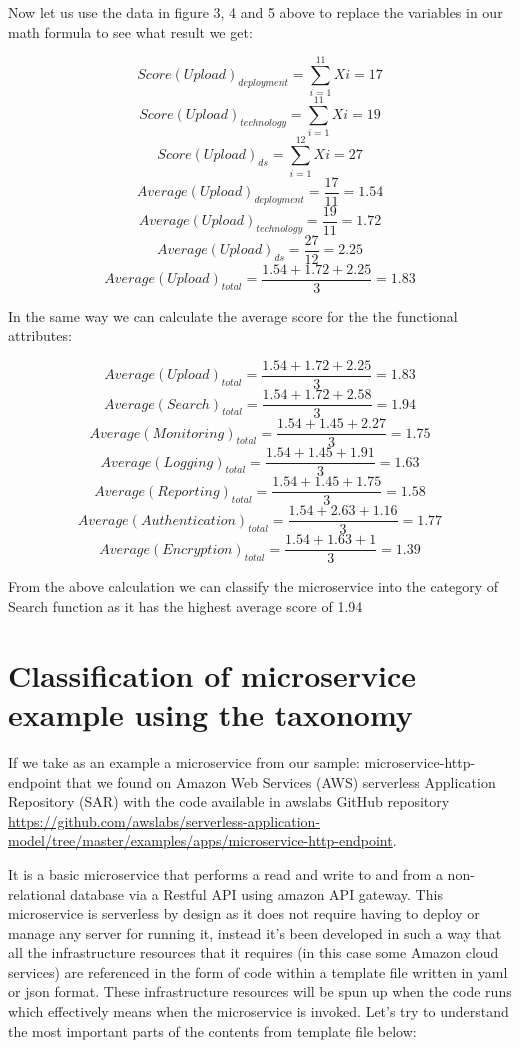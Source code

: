 \documentclass{article}
\begin{document}
Now let us use the data in figure 3, 4 and 5 above to replace the variables in our math formula to see what result we get:

\[Score(Upload)_{deployment}=\sum_{i=1}^{11}Xi = 17\] 
\[Score(Upload)_{technology}=\sum_{i=1}^{11}Xi = 19\] 
\[Score(Upload)_{ds}=\sum_{i=1}^{12}Xi = 27\] 
\[Average(Upload)_{deployment}=\frac{17}{11} = 1.54 \]
\[Average(Upload)_{technology}=\frac{19}{11} = 1.72 \]
\[Average(Upload)_{ds}=\frac{27}{12} = 2.25 \]
\[Average(Upload)_{total}=\frac{1.54 + 1.72 + 2.25}{3} = 1.83\]

In the same way we can calculate the average score for the the functional attributes:

\[Average(Upload)_{total}=\frac{1.54 + 1.72 + 2.25}{3} = 1.83\]
\[Average(Search)_{total}=\frac{1.54 + 1.72 + 2.58}{3} = 1.94\]
\[Average(Monitoring)_{total}=\frac{1.54 + 1.45 + 2.27}{3} = 1.75\]
\[Average(Logging)_{total}=\frac{1.54 + 1.45 + 1.91}{3} = 1.63\]
\[Average(Reporting)_{total}=\frac{1.54 + 1.45 + 1.75}{3} = 1.58\]
\[Average(Authentication)_{total}=\frac{1.54 + 2.63 + 1.16}{3} = 1.77\]
\[Average(Encryption)_{total}=\frac{1.54 + 1.63 + 1}{3} = 1.39\]

From the above calculation we can classify the microservice into the category of Search function as it has the highest average score of 1.94

\section{Classification of microservice example using the taxonomy}

If we take as an example a microservice from our sample: microservice-http-endpoint that we found on Amazon Web Services (AWS) serverless Application Repository (SAR) with the code available in awslabs GitHub repository \url{https://github.com/awslabs/serverless-application-model/tree/master/examples/apps/microservice-http-endpoint}.

It is a basic microservice that performs a read and write to and from a non-relational database via a Restful API using amazon API gateway. This microservice is serverless by design as it does not require having to deploy or manage any server for running it, instead it’s been developed in such a way that all the infrastructure resources that it requires (in this case some Amazon cloud services) are referenced in the form of code within a template file written in yaml or json format. These infrastructure resources will be spun up when the code runs which effectively means when the microservice is invoked. Let’s try to understand the most important parts of the contents from template file below:
\end{document}
